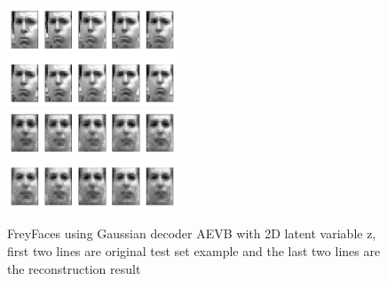 \documentclass[11pt]{article}
\begin{document}
\begin{figure}[H]
\begin{center}
\includegraphics[width = 0.45\textwidth]{fig/f_test1}\\
\vspace{5mm}
\includegraphics[width = 0.45\textwidth]{fig/f_new1}\\
\caption{FreyFaces using Gaussian decoder AEVB with 2D latent variable z, first two lines are original test set example and the last two lines are the reconstruction result} \label{fig:FreyFaces-reconst}
\end{center}
\end{figure}
\end{document}
